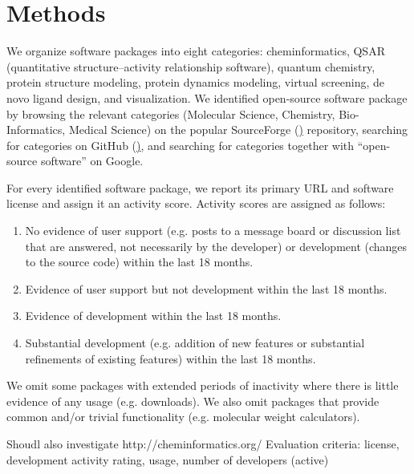 \section{Methods}

We organize software packages into eight categories: cheminformatics, QSAR (quantitative structure–activity relationship software), quantum chemistry, protein structure modeling, protein dynamics modeling, virtual screening, de novo ligand design, and visualization.
We identified open-source software package by browsing the relevant categories (Molecular Science, Chemistry, Bio-Informatics, Medical Science) on the popular SourceForge (\href{http://sourceforge.net}) repository, searching for categories on GitHub (\href{http://github.com}), and searching for categories together with ``open-source software'' on Google.

For every identified software package, we report its primary URL and software license and assign it an activity score. Activity scores are assigned as follows: 
\begin{enumerate}
  \setcounter{enumi}{0}
  \item No evidence of user support (e.g. posts to a message board or discussion list that are answered, not necessarily by the developer) or development (changes to the source code) within the last 18 months.
  \item Evidence of user support but not development within the last 18 months.
  \item Evidence of development within the last 18 months.
  \item Substantial development (e.g. addition of new features or substantial refinements of existing features) within the last 18 months.
\end{enumerate}

We omit some packages with extended periods of inactivity where there is little evidence of any usage (e.g. downloads).  We also omit packages that provide common and/or trivial functionality (e.g. molecular weight calculators).

Shoudl also investigate http://cheminformatics.org/
Evaluation criteria: license, development activity rating, usage, number of developers (active)


 
 

  
  